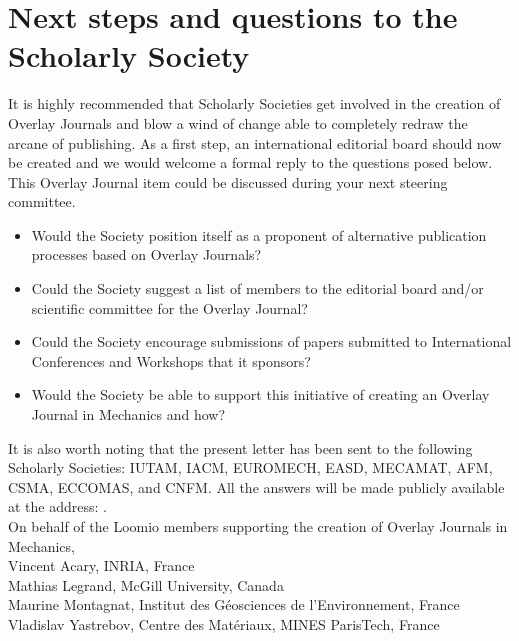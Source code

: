 \documentclass[11pt]{article}
\begin{document}
\section*{Next steps and questions to the Scholarly Society}
It is highly recommended that Scholarly Societies get involved in the creation of Overlay Journals and blow a wind of change able to completely redraw the arcane of publishing. As a first step, an international editorial board should now be created and we would welcome a formal reply to the questions posed below. This Overlay Journal item could be discussed during your next steering committee.
\begin{itemize}
\item Would the Society position itself as a proponent of alternative publication processes based on Overlay Journals? 
\item Could the Society suggest a list of members to the editorial board and/or scientific committee for the Overlay Journal? 
\item Could the Society encourage submissions of papers submitted to International Conferences and Workshops that it sponsors? 
\item Would the Society be able to support this initiative of creating an Overlay Journal in Mechanics and how?
\end{itemize}
It is also worth noting that the present letter has been sent to the following Scholarly Societies: IUTAM, IACM, EUROMECH, EASD, MECAMAT, AFM, CSMA, ECCOMAS, and CNFM. All the answers will be made publicly available at the address: {\small{}}.\\[5pt]

On behalf of the Loomio members supporting the creation of Overlay Journals in Mechanics, \\[10pt]
Vincent Acary, INRIA, France\\
Mathias Legrand, McGill University, Canada\\
Maurine Montagnat, Institut des Géosciences de l'Environnement, France\\
Vladislav Yastrebov, Centre des Matériaux, MINES ParisTech, France
\end{document}
